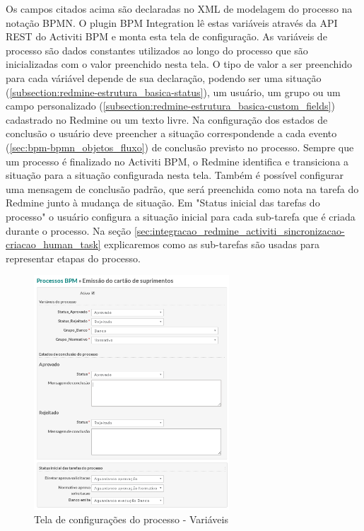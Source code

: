 Os campos citados acima são declaradas no XML de modelagem do processo na notação BPMN. O plugin BPM Integration lê estas variáveis através da API REST do Activiti BPM e monta esta tela de configuração.
As variáveis de processo são dados constantes utilizados ao longo do processo que são inicializadas com o valor preenchido nesta tela. O tipo de valor a ser preenchido para cada váriável depende de sua declaração, podendo ser uma situação (\ref{subsection:redmine-estrutura_basica-status}), um usuário, um grupo ou um campo personalizado (\ref{subsection:redmine-estrutura_basica-custom_fields}) cadastrado no Redmine ou um texto livre. Na configuração dos estados de conclusão o usuário deve preencher a situação correspondende a cada evento (\ref{sec:bpm-bpmn_objetos_fluxo}) de conclusão previsto no processo. Sempre que um processo é finalizado no Activiti BPM, o Redmine identifica e transiciona a situação para a situação configurada nesta tela. Também é possível configurar uma mensagem de conclusão padrão, que será preenchida como nota na tarefa do Redmine junto à mudança de situação. Em "Status inicial das tarefas do processo" o usuário configura a situação inicial para cada sub-tarefa que é criada durante o processo. Na seção \ref{sec:integracao_redmine_activiti_sincronizacao-criacao_human_task} explicaremos como as sub-tarefas são usadas para representar etapas do processo.

\begin{figure}[H]
\centering
\includegraphics[width=0.65\textwidth]{imagens/plugin_process_settings1.png}
\caption{Tela de configurações do processo - Variáveis}
\label{fig:plugin_process_settings_variables}
\end{figure}

